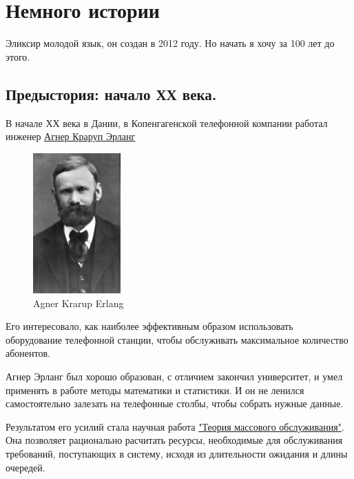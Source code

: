 \chapter{Немного истории}

Эликсир молодой язык, он создан в 2012 году. Но начать я хочу за 100 лет до этого. 

\section{Предыстория: начало ХХ века.}

В начале ХХ века в Дании, в Копенгагенской телефонной компании работал инженер \href{https://ru.wikipedia.org/wiki/%D0%AD%D1%80%D0%BB%D0%B0%D0%BD%D0%B3,_%D0%90%D0%B3%D0%BD%D0%B5%D1%80_%D0%9A%D1%80%D0%B0%D1%80%D1%83%D0%BF}{Агнер Краруп Эрланг}

\begin{figure}[h]
  \centering
  \includegraphics[width=0.3\textwidth]{../lesson_02/img/agner_krarup_erlang.jpg}
  \caption{Agner Krarup Erlang}
\end{figure}

Его интересовало, как наиболее эффективным образом использовать оборудование телефонной станции, чтобы обслуживать максимальное количество абонентов.

Агнер Эрланг был хорошо образован, с отличием закончил университет, и умел применять в работе методы математики и статистики. И он не ленился самостоятельно залезать на телефонные столбы, чтобы собрать нужные данные.

Результатом его усилий стала научная работа \href{https://ru.wikipedia.org/wiki/%D0%A2%D0%B5%D0%BE%D1%80%D0%B8%D1%8F_%D0%BC%D0%B0%D1%81%D1%81%D0%BE%D0%B2%D0%BE%D0%B3%D0%BE_%D0%BE%D0%B1%D1%81%D0%BB%D1%83%D0%B6%D0%B8%D0%B2%D0%B0%D0%BD%D0%B8%D1%8F}{"Теория массового обслуживания"}. Она позволяет рационально расчитать ресурсы, необходимые для обслуживания требований, поступающих в систему, исходя из длительности ожидания и длины очередей.

